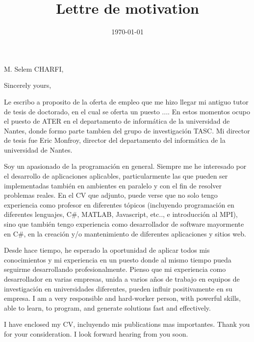 \documentclass[11pt,a4paper,sans]{moderncv} %
\title{Lettre de motivation}
\begin{document}


\clearpage

\date{\today} %
\opening{M. Selem CHARFI,} %
\closing{Sincerely yours,} %

\makelettertitle %

Le escribo a proposito de la oferta de empleo que me hizo llegar mi antiguo tutor de tesis de doctorado, en el cual se oferta un puesto .... 
En estos momentos ocupo el puesto de ATER en el departamento de informática de la universidad de Nantes, donde formo parte tambien del grupo de investigación TASC. Mi director de tesis fue Eric Monfroy, director del departamento del informática de la universidad de Nantes.

Soy un apasionado de la programación en general. Siempre me he interesado por el desarrollo de aplicaciones aplicables, particularmente las que pueden ser implementadas también en ambientes en paralelo y con el fin de resolver problemas reales. En el CV que adjunto, puede verse que no solo tengo experiencia como profesor en diferentes tópicos (incluyendo programación en diferentes lenguajes, C\#, MATLAB, Javascript, etc.., e introducción al MPI), sino que también tengo experiencia como desarrollador de software mayormente en C\#, en la creación y/o mantenimiento de diferentes aplicaciones y sitios web. 

Desde hace tiempo, he esperado la oportunidad de aplicar todos mis conocimientos y mi experiencia en un puesto donde al mismo tiempo pueda seguirme desarrollando profesionalmente. Pienso que mi experiencia como desarrollador en varias empresas, unida a varios años de trabajo en equipos de investigación en universidades diferentes, pueden influir positivamente en su empresa. I am a very responsible and hard-worker person, with powerful skills, able to learn, to program, and generate solutions fast and effectively.

I have enclosed my CV, incluyendo mis publications mas importantes. Thank you for your consideration. I look forward hearing from you soon.

\makeletterclosing %

\end{document}
